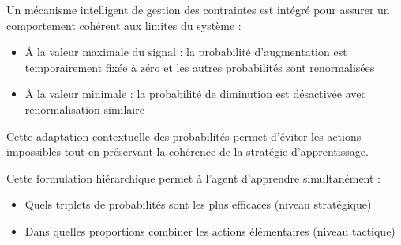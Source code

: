 \documentclass[a4paper,11pt]{article}
\begin{document}
Un mécanisme intelligent de gestion des contraintes est intégré pour assurer un comportement cohérent aux limites du système :

\begin{itemize}
    \item À la valeur maximale du signal : la probabilité d'augmentation est temporairement fixée à zéro et les autres probabilités sont renormalisées
    \item À la valeur minimale : la probabilité de diminution est désactivée avec renormalisation similaire
\end{itemize}

Cette adaptation contextuelle des probabilités permet d'éviter les actions impossibles tout en préservant la cohérence de la stratégie d'apprentissage.

Cette formulation hiérarchique permet à l'agent d'apprendre simultanément :
\begin{itemize}
    \item Quels triplets de probabilités sont les plus efficaces (niveau stratégique)
    \item Dans quelles proportions combiner les actions élémentaires (niveau tactique)
\end{itemize}
\end{document}
